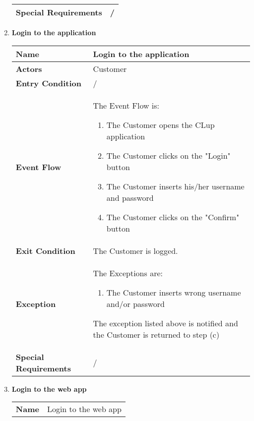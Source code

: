 \begin{enumerate}
{\begin{longtable}{|L{4cm}|L{10cm}|}
                \hline
                \textbf{Special Requirements} & / \\
                \hline
            \end{longtable}}
            \item \textbf{Login to the application}{\renewcommand{\arraystretch}{2}
            \begin{longtable}{|L{4cm}|L{10cm}|}
                \hline
                \textbf{Name} & Login to the application \\
                \hline
                \textbf{Actors} & Customer \\
                \hline
                \textbf{Entry Condition} & / \\
                \hline
                \textbf{Event Flow} & The Event Flow is: \begin{enumerate}
                        \item The Customer opens the CLup application
                        \item The Customer clicks on the "Login" button
                        \item The Customer inserts his/her username and password
                        \item The Customer clicks on the "Confirm" button
                    \end{enumerate} \\
                \hline
                \textbf{Exit Condition} & The Customer is logged. \\
                \hline
                \textbf{Exception} & The Exceptions are: \begin{enumerate}
                        \item The Customer inserts wrong username and/or password
                    \end{enumerate} The exception listed above is notified and the Customer is returned to step (c) \\
                \hline
                \textbf{Special Requirements} & / \\
                \hline
            \end{longtable}}
            \item \textbf{Login to the web app}{\renewcommand{\arraystretch}{2}
            \begin{longtable}{|L{4cm}|L{10cm}|}
                \hline
                \textbf{Name} & Login to the web app \\

\end{longtable}}
\end{enumerate}
